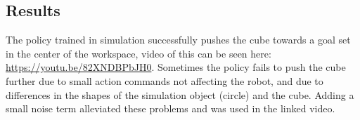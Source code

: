 \subsection{Results}

The policy trained in simulation successfully pushes the cube towards a goal
set in the center of the workspace, video of this can be seen here:
\url{https://youtu.be/82XNDBPbJH0}. Sometimes the policy fails to push the cube
further due to small action commands not affecting the robot, and due to
differences in the shapes of the simulation object (circle) and the cube.
Adding a small noise term alleviated these problems and was used in the linked
video.
